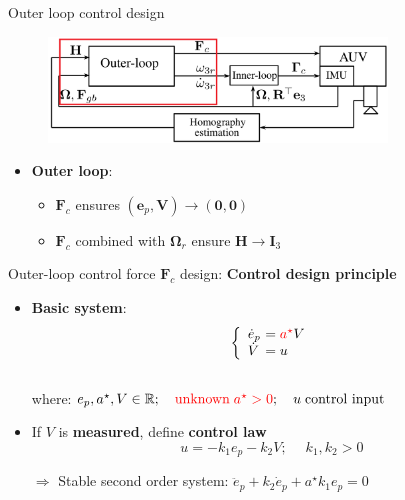 \documentclass{beamer}
\begin{document}
\begin{frame}{Outer loop control design}
\begin{figure}
	\includegraphics[width = 90mm]{Images/Block_diagram_2_outer.png}
\end{figure}
\begin{itemize}
	\item \textbf{Outer loop}:
	\begin{itemize}
		\item $\mathbf{F}_c$ ensures $(\mathbf{e}_p, \mathbf{V}) \rightarrow (\mathbf{0},\mathbf{0})$
		\item $\mathbf{F}_c$ combined with $\mathbf{\Omega}_{r}$ ensure $\mathbf{H} \rightarrow \mathbf{I}_3$		
	\end{itemize}
\end{itemize}
\end{frame}

\begin{frame}{Outer-loop control force $\mathbf{F}_c$ design: {\bf \color{red} Control design principle}}
	\begin{itemize}
		\item \textbf{Basic system}: 
		\begin{equation*}
		\left\{
		\begin{array}{ll}
		\dot {{e}}_p &\!\!\!\!= {\color{red} a^\star} V \\
		\dot{{V}}&\!\!\!\!=  u
		\end{array}\right. \vspace{-0.15cm}
		\end{equation*}\\
		where: $e_p, a^\star, V \in \mathbb{R};{\color{red} \quad \text{unknown}\; a^\star    >0}; \quad u \; \text{control input}$
		\pause
		\vspace{1cm}
		\item  If $V$ is \textbf{measured}, define \textbf{control law} 
		$$u = - k_1 e_p - k_2 V; {\quad \; k_1, k_2>0}$$
		
		$\Rightarrow$ Stable second order system: $\ddot{e}_p + k_2 \dot{e}_p + a^\star k_1 e_p = 0$	
	\end{itemize}
\end{frame}
\end{document}
